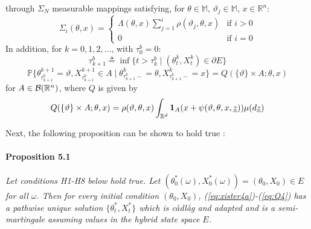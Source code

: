 \documentclass[copyright,creativecommons]{eptcs}
\begin{document}
through $\Sigma_N$ measurable mappings satisfying, for $\theta \in
\mathbb{M}$, $\vartheta_j \in \mathbb{M}$, $x \in \mathbb{R}^{n}$:
\vspace{-2mm}
\begin{equation}\label{eq:sigma4}
\Sigma_i(\theta,x) = \left\{
\begin{array}{ll}
\Lambda(\theta,x) \sum_{j=1}^i \rho(\vartheta_j, \theta,x) & \mbox{if } i>0  \\
0   & \mbox{if } i=0
\end{array} \right.
\end{equation}
In addition, for $k = 0, 1, 2, \ldots$, with $\tau_0^b = 0$:
\vspace{-2mm}
\begin{equation}\label{eq:taui4}
\tau_{k+1}^b \triangleq \inf \{t > \tau_{k}^b \mid (\theta_t^{k},
X_t^{k})\in \partial E\}
\end{equation}
\begin{equation}\label{eq:pxii4}
\mathbb{P}\{\theta_{\tau_{k+1}^b}^{k+1} = \vartheta,
X_{\tau_{k+1}^b}^{k+1} \in {A} \mid \theta_{\tau_{k+1}^b-}^{k}
=\theta, X_{\tau_{k+1}^b-}^{k} = x \} = Q(\{\vartheta\} \times A;
\theta,x)
\end{equation}
for $A \in {\cal B}(\mathbb{R}^n)$, where $Q$ is given by
\vspace{-2mm}
\begin{equation}\label{eq:Q4}
Q(\{\vartheta\}\times A; \theta, x) = \rho(\vartheta,\theta, x)
\int_{\mathbb{R}^d} {\bf 1}_{A} (x + \psi (\vartheta, \theta, x,
\underline{z})) \mu(d\underline{z})
\end{equation}


Next, the following proposition can be shown to hold true
\cite{EverdijBlom2009}:

\paragraph{Proposition 5.1}\label{th:BlomThirdTh}
\emph{Let conditions H1-H8 below hold true. Let $(\theta_0^* (\omega),
X_0^*(\omega)) = (\theta_0, X_0)\in E$ for all $\omega$. Then for
every initial condition $(\theta_0, X_0)$,
(\ref{eq:xister4a})-(\ref{eq:Q4}) has a pathwise unique solution
$\{\theta_t^*, X_t^*\}$ which is c\`adl\`ag and adapted and is a
semi-martingale assuming values in the hybrid state space $E$.}
\end{document}
